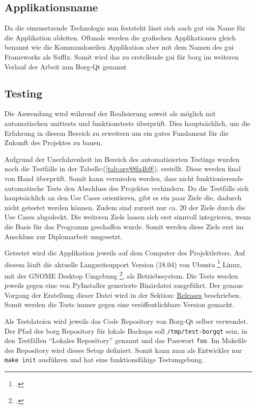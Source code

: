 \subsection{Applikationsname}
\label{sec:orgef6c2a4}

Da die einzusetzende Technologie nun feststeht lässt sich auch gut ein Name für
die Applikation ableiten. Oftmals werden die grafischen Applikationen gleich
benannt wie die Kommandozeilen Applikation aber mit dem Namen des \gls{gui}
Frameworks als Suffix. Somit wird das zu erstellende \gls{gui} für \gls{borg} im
weiteren Verlauf der Arbeit nun Borg-Qt genannt

\subsection{Testing}
\label{sec:orge549d43}

Die Anwendung wird während der Realisierung soweit als möglich mit
automatischen \glspl{unittest} und \glspl{funktionstest} überprüft. Dies
hauptsächlich, um die Erfahrung in diesem Bereich zu erweitern um ein gutes
Fundament für die Zukunft des Projektes zu bauen.

Aufgrund der Unerfahrenheit im Bereich des automatisierten Testings wurden noch
die Testfälle in der Tabelle:(\ref{tab:org88fa4b9}), erstellt. Diese werden final von
Hand überprüft. Somit kann vermieden werden, dass nicht funktionierende
automatische Tests den Abschluss des Projektes verhindern. Da die Testfälle
sich hauptsächlich an den Use Cases orientieren, gibt es ein paar Ziele die,
dadurch nicht getestet werden können. Zudem sind zurzeit nur ca. 20 der Ziele
durch die Use Cases abgedeckt. Die weiteren Ziele lassen sich erst sinnvoll
integrieren, wenn die Basis für das Programm geschaffen wurde. Somit werden
diese Ziele erst im Anschluss zur Diplomarbeit umgesetzt.

Getestet wird die Applikation jeweils auf dem Computer des Projektleiters. Auf
diesem läuft die aktuelle Langzeitsupport Version (18.04) von Ubuntu
\footcite{ubuntu} Linux, mit der GNOME Desktop Umgebung \footcite{gnome}, als
Betriebssystem. Die Tests werden jeweils gegen eine von PyInstaller generierte
Binärdatei ausgeführt. Der genaue Vorgang der Erstellung dieser Datei wird in
der Sektion: \hyperref[sec:org3adb3b3]{Releases} beschrieben. Somit werden die Tests immer gegen eine
veröffentlichbare Version gemacht.
\pagebreak

Als Testdateien wird jeweils das Code Repository von Borg-Qt selber verwendet.
Der Pfad des \gls{borg} Repository für lokale Backups soll \texttt{/tmp/test-borgqt}
sein, in den Testfällen "`Lokales Repository"' genannt und das Passwort \texttt{foo}.
Im Makefile des Repository wird dieses Setup definiert. Somit kann man als
Entwickler nur \texttt{make init} ausführen und hat eine funktionsfähige Testumgebung.

